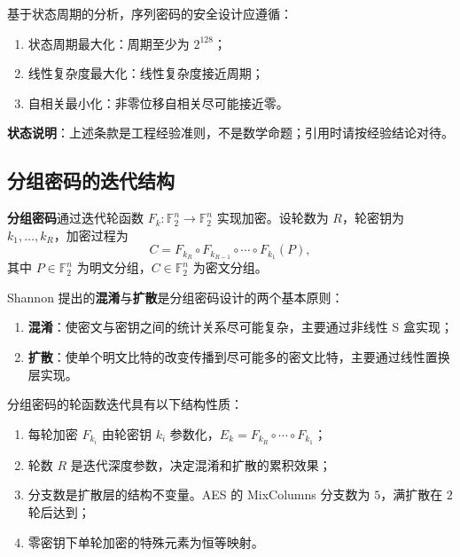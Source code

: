 \begin{remark}\label{prop:stream_cipher_security}
基于状态周期的分析，序列密码的安全设计应遵循：
\begin{enumerate}[label=(\roman*)]
    \item 状态周期最大化：周期至少为 \(2^{128}\)；
    \item 线性复杂度最大化：线性复杂度接近周期；
    \item 自相关最小化：非零位移自相关尽可能接近零。
\end{enumerate}
\textbf{状态说明}：上述条款是工程经验准则，不是数学命题；引用时请按经验结论对待。
\end{remark}

\subsection{分组密码的迭代结构}

\begin{definition}[分组密码的轮函数]\label{def:block_cipher_round_function}
\textbf{分组密码}通过迭代轮函数 \(F_k:\mathbb F_2^n\to\mathbb F_2^n\) 实现加密。设轮数为 \(R\)，轮密钥为 \(k_1,\dots,k_R\)，加密过程为
\[
C=F_{k_R}\circ F_{k_{R-1}}\circ\cdots\circ F_{k_1}(P),
\]
其中 \(P\in\mathbb F_2^n\) 为明文分组，\(C\in\mathbb F_2^n\) 为密文分组。
\end{definition}

\begin{definition}[混淆与扩散]\label{def:confusion_diffusion}
Shannon 提出的\textbf{混淆}与\textbf{扩散}是分组密码设计的两个基本原则：
\begin{enumerate}[label=(\roman*)]
    \item \textbf{混淆}：使密文与密钥之间的统计关系尽可能复杂，主要通过非线性 S 盒实现；
    \item \textbf{扩散}：使单个明文比特的改变传播到尽可能多的密文比特，主要通过线性置换层实现。
\end{enumerate}
\end{definition}

\begin{proposition}[分组密码的迭代结构]\label{prop:block_cipher_iteration_structure}
分组密码的轮函数迭代具有以下结构性质：
\begin{enumerate}[label=(\roman*)]
    \item 每轮加密 \(F_{k_i}\) 由轮密钥 \(k_i\) 参数化，\(E_k=F_{k_R}\circ\cdots\circ F_{k_1}\)；
    \item 轮数 \(R\) 是迭代深度参数，决定混淆和扩散的累积效果；
    \item 分支数是扩散层的结构不变量。AES 的 MixColumns 分支数为 \(5\)，满扩散在 \(2\) 轮后达到；
    \item 零密钥下单轮加密的特殊元素为恒等映射。
\end{enumerate}
\end{proposition}

